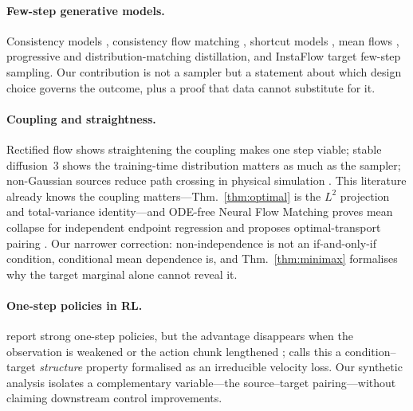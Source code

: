 \documentclass{article}
\theoremstyle{plain}
\begin{document}
\paragraph{Few-step generative models.} Consistency models \citep{song2023consistency},
consistency flow matching \citep{yang2024consistencyfm}, shortcut models
\citep{frans2024shortcut}, mean flows \citep{geng2025meanflows}, progressive
\citep{salimans2022progressivedistill} and distribution-matching \citep{yin2024dmd}
distillation, and InstaFlow \citep{liu2024instaflow} target few-step sampling. Our
contribution is not a sampler but a statement about which design choice governs the
outcome, plus a proof that data cannot substitute for it.

\paragraph{Coupling and straightness.} Rectified flow \citep{liu2023rectifiedflow} shows
straightening the coupling makes one step viable; stable diffusion~3 \citep{esser2024sd3}
shows the training-time distribution matters as much as the sampler; non-Gaussian sources
reduce path crossing in physical simulation \citep{onestepfm2026}. This literature
\citep{tong2024cfm,liu2023rectifiedflow,pooladian2023multisample} already knows the
coupling matters---Thm.~\ref{thm:optimal} is the $L^2$ projection and total-variance
identity---and ODE-free Neural Flow Matching proves mean collapse for independent endpoint
regression and proposes optimal-transport pairing \citep{shou2026nfm}. Our narrower
correction: non-independence is not an if-and-only-if condition, conditional mean
dependence is, and Thm.~\ref{thm:minimax} formalises why the target marginal alone cannot
reveal it.

\paragraph{One-step policies in RL.} \citep{nguyen2026bfq,li2026ofp,mvp2026,lps2026,
flame2026,fan2026} report strong one-step policies, but the advantage disappears when the
observation is weakened or the action chunk lengthened
\citep{li2026ofp,letitbesimple2026}; \citep{letitbesimple2026} calls this a
condition--target \emph{structure} property formalised as an irreducible velocity loss. Our
synthetic analysis isolates a complementary variable---the source--target pairing---without
claiming downstream control improvements.
\end{document}
